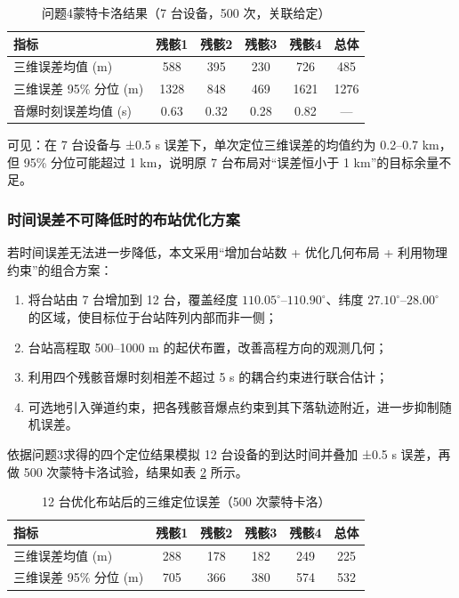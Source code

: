 \documentclass[12pt,a4paper]{article}
\begin{document}
\begin{table}[H]
\centering
\caption{问题4蒙特卡洛结果（7 台设备，500 次，关联给定）}
\label{tab:q4mc}
\begin{tabular}{lccccc}
\toprule
指标 & 残骸1 & 残骸2 & 残骸3 & 残骸4 & 总体 \\
\midrule
三维误差均值 (m) & 588 & 395 & 230 & 726 & 485 \\
三维误差 95\% 分位 (m) & 1328 & 848 & 469 & 1621 & 1276 \\
音爆时刻误差均值 (s) & 0.63 & 0.32 & 0.28 & 0.82 & --- \\
\bottomrule
\end{tabular}
\end{table}

可见：在 7 台设备与 ±0.5 s 误差下，单次定位三维误差的均值约为 0.2--0.7 km，但 95\% 分位可能超过 1 km，说明原 7 台布局对“误差恒小于 1 km”的目标余量不足。

\subsubsection{时间误差不可降低时的布站优化方案}

若时间误差无法进一步降低，本文采用“增加台站数 + 优化几何布局 + 利用物理约束”的组合方案：

\begin{enumerate}[label=\arabic*.]
  \item 将台站由 7 台增加到 12 台，覆盖经度 $110.05^\circ$--$110.90^\circ$、纬度 $27.10^\circ$--$28.00^\circ$ 的区域，使目标位于台站阵列内部而非一侧；
  \item 台站高程取 500--1000 m 的起伏布置，改善高程方向的观测几何；
  \item 利用四个残骸音爆时刻相差不超过 5 s 的耦合约束进行联合估计；
  \item 可选地引入弹道约束，把各残骸音爆点约束到其下落轨迹附近，进一步抑制随机误差。
\end{enumerate}

依据问题3求得的四个定位结果模拟 12 台设备的到达时间并叠加 ±0.5 s 误差，再做 500 次蒙特卡洛试验，结果如表 \ref{tab:q4new} 所示。

\begin{table}[H]
\centering
\caption{12 台优化布站后的三维定位误差（500 次蒙特卡洛）}
\label{tab:q4new}
\begin{tabular}{lccccc}
\toprule
指标 & 残骸1 & 残骸2 & 残骸3 & 残骸4 & 总体 \\
\midrule
三维误差均值 (m) & 288 & 178 & 182 & 249 & 225 \\
三维误差 95\% 分位 (m) & 705 & 366 & 380 & 574 & 532 \\
\bottomrule
\end{tabular}
\end{table}
\end{document}
